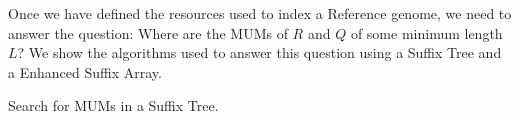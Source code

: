 \documentclass{acm_proc_article-sp}
\begin{document}
Once we have defined the resources used to index a Reference genome, we need to answer the question: Where are the MUMs of $R$ and $Q$ of some minimum length $L$? We show the algorithms used to answer this question using a Suffix Tree and a Enhanced Suffix Array.

\linesnumbered
\begin{algorithm}
  \dontprintsemicolon
  \Input{\R, \Q, \L}
  \caption{Search for MUMs in a Suffix Tree.}
\end{algorithm}

\end{document}
